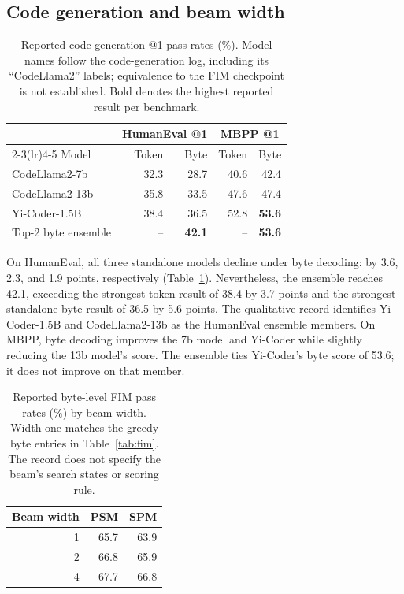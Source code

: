 \documentclass{article}
\begin{document}
\subsection{Code generation and beam width}
\label{sec:code}
\begin{table}[t]
\caption{Reported code-generation @1 pass rates (\%). Model names follow the code-generation log, including its ``CodeLlama2'' labels; equivalence to the FIM checkpoint is not established. Bold denotes the highest reported result per benchmark.}
\label{tab:code}
\centering
\begin{tabular}{lrrrr}
\toprule
 & \multicolumn{2}{c}{HumanEval @1} & \multicolumn{2}{c}{MBPP @1}\\
\cmidrule(lr){2-3}\cmidrule(lr){4-5}
Model & Token & Byte & Token & Byte\\
\midrule
CodeLlama2-7b & 32.3 & 28.7 & 40.6 & 42.4\\
CodeLlama2-13b & 35.8 & 33.5 & 47.6 & 47.4\\
Yi-Coder-1.5B & 38.4 & 36.5 & 52.8 & \textbf{53.6}\\
Top-2 byte ensemble & -- & \textbf{42.1} & -- & \textbf{53.6}\\
\bottomrule
\end{tabular}
\end{table}

On HumanEval, all three standalone models decline under byte decoding: by 3.6, 2.3, and 1.9 points, respectively (Table~\ref{tab:code}). Nevertheless, the ensemble reaches 42.1, exceeding the strongest token result of 38.4 by 3.7 points and the strongest standalone byte result of 36.5 by 5.6 points. The qualitative record identifies Yi-Coder-1.5B and CodeLlama2-13b as the HumanEval ensemble members. On MBPP, byte decoding improves the 7b model and Yi-Coder while slightly reducing the 13b model's score. The ensemble ties Yi-Coder's byte score of 53.6; it does not improve on that member.

\begin{table}[t]
\caption{Reported byte-level FIM pass rates (\%) by beam width. Width one matches the greedy byte entries in Table~\ref{tab:fim}. The record does not specify the beam's search states or scoring rule.}
\label{tab:beam}
\centering
\begin{tabular}{rrr}
\toprule
Beam width & PSM & SPM\\
\midrule
1 & 65.7 & 63.9\\
2 & 66.8 & 65.9\\
4 & 67.7 & 66.8\\
\bottomrule
\end{tabular}
\end{table}
\end{document}
